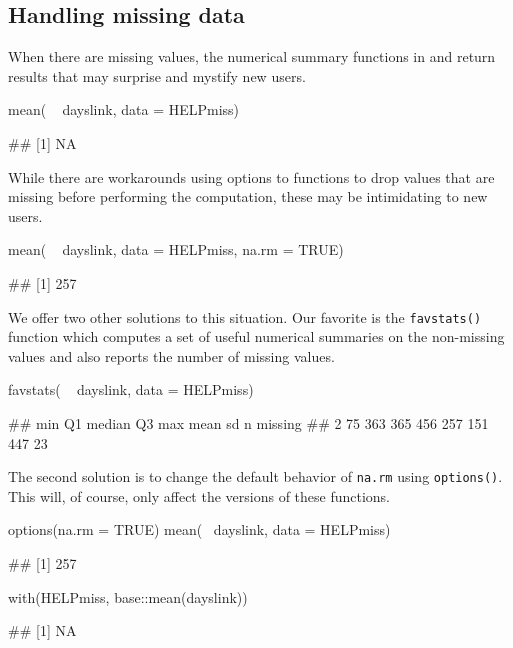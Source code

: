 \subsection{Handling missing data}\label{handling-missing-data}

When there are missing values, the numerical summary functions in
 and  return results that may surprise and mystify
new users.

\begin{Schunk}
\begin{Sinput}
mean( ~ dayslink, data = HELPmiss)
\end{Sinput}
\begin{Soutput}
## [1] NA
\end{Soutput}
\end{Schunk}

\noindent
While there are workarounds using options to functions to drop values
that are missing before performing the computation, these may be
intimidating to new users.

\begin{Schunk}
\begin{Sinput}
mean( ~ dayslink, data = HELPmiss, na.rm = TRUE)
\end{Sinput}
\begin{Soutput}
## [1] 257
\end{Soutput}
\end{Schunk}

We offer two other solutions to this situation. Our favorite is the
\texttt{favstats()} function which computes a set of useful numerical
summaries on the non-missing values and also reports the number of
missing values.

\begin{Schunk}
\begin{Sinput}
favstats( ~ dayslink, data = HELPmiss)
\end{Sinput}
\begin{Soutput}
##  min Q1 median  Q3 max mean  sd   n missing
##    2 75    363 365 456  257 151 447      23
\end{Soutput}
\end{Schunk}

The second solution is to change the default behavior of \texttt{na.rm}
using \texttt{options()}. This will, of course, only affect the
 versions of these functions.

\begin{Schunk}
\begin{Sinput}
options(na.rm = TRUE)
mean(~ dayslink, data = HELPmiss)
\end{Sinput}
\begin{Soutput}
## [1] 257
\end{Soutput}
\begin{Sinput}
with(HELPmiss, base::mean(dayslink))
\end{Sinput}
\begin{Soutput}
## [1] NA
\end{Soutput}
\end{Schunk}

